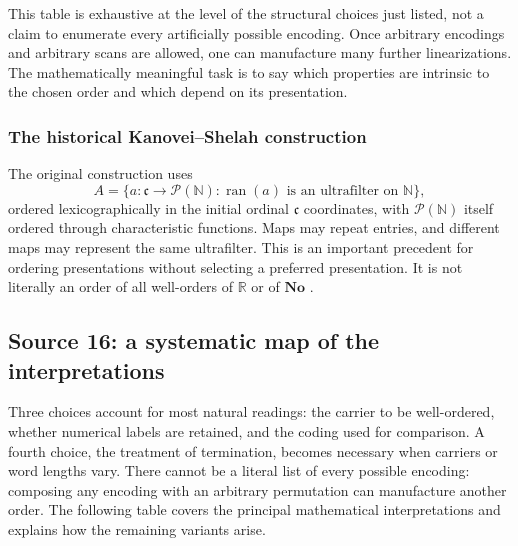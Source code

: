 \documentclass[11pt]{article}
\theoremstyle{definition}
\theoremstyle{remark}
\newcommand{\No}{\mathbf{No}}
\newcommand{\ran}{\operatorname{ran}}
\begin{document}
This table is exhaustive at the level of the structural choices just
listed, not a claim to enumerate every artificially possible encoding.
Once arbitrary encodings and arbitrary scans are allowed, one can manufacture
many further linearizations. The mathematically meaningful task is to say
which properties are intrinsic to the chosen order and which depend on
its presentation.

\subsubsection{The historical Kanovei--Shelah construction}

The original construction uses
\[
 A=\{a:\mathfrak c\to\mathcal P(\mathbb N):\ran(a)
       \text{ is an ultrafilter on }\mathbb N\},
\]
ordered lexicographically in the initial ordinal $\mathfrak c$ coordinates,
with $\mathcal P(\mathbb N)$ itself ordered through characteristic functions.
Maps may repeat entries, and different maps may represent the same
ultrafilter. This is an important precedent for ordering presentations
without selecting a preferred presentation. It is not literally an order
of all well-orders of $\mathbb R$ or of $\No$ \cite[Section~1]{KanoveiShelah}.

\subsection{Source 16: a systematic map of the interpretations}\label{swo:ds:sec:interpretations}

Three choices account for most natural readings: the carrier to be
well-ordered, whether numerical labels are retained, and the coding used for
comparison. A fourth choice, the treatment of termination, becomes necessary
when carriers or word lengths vary. There cannot be a literal list of every
possible encoding: composing any encoding with an arbitrary permutation can
manufacture another order. The following table covers the principal
mathematical interpretations and explains how the remaining variants arise.
\end{document}

